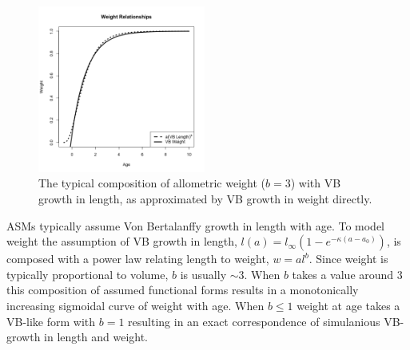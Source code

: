 %
\begin{figure} %
\vspace{-1.5cm}
\includegraphics[width=0.49\textwidth]{plots/vbOpt.png}
\vspace{-1cm}
\caption{
The typical composition of allometric weight ($b=3$) with VB growth in length, as
approximated by VB growth in weight directly.
}
\label{vbComp}
\end{figure}

ASMs typically assume Von Bertalanffy %
\cite[VB]{von_bertalanffy_quantitative_1938} growth in length with age. To model
weight the assumption of VB growth in length, 
$l(a)=l_\infty(1-e^{-\kappa (a-a_0)})$, 
is composed with a power law relating length to weight, $w=al^b$. 
%
Since weight is typically proportional to volume, $b$ is usually $\sim3$. When 
$b$ takes a value around $3$ this composition of assumed functional forms %
results in a monotonically increasing sigmoidal curve of weight with 
age. When $b\le1$ weight at age takes a VB-like form with $b=1$ resulting in
an exact correspondence of simulanious VB-growth in length and weight.

